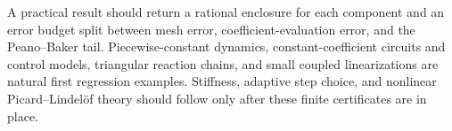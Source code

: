 \begin{remark}
\label{rem:ode-error-certificates}
A practical result should return a rational enclosure for each component and
an error budget split between mesh error, coefficient-evaluation error, and
the Peano--Baker tail. Piecewise-constant dynamics, constant-coefficient
circuits and control models, triangular reaction chains, and small coupled
linearizations are natural first regression examples. Stiffness, adaptive
step choice, and nonlinear Picard--Lindel\"of theory should follow only after
these finite certificates are in place.
\end{remark}
